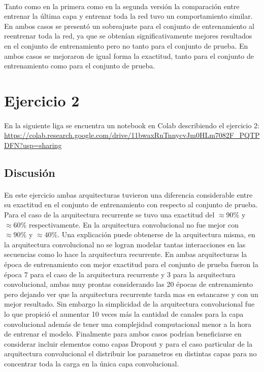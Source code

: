 \documentclass[12pt]{article}
\begin{document}
	  \paragraph{} Tanto como en la primera como en la segunda versión la comparación entre entrenar la última capa y entrenar toda la red tuvo un comportamiento similar. En ambos casos se presentó un sobreajuste para el conjunto de entrenamiento al reentrenar toda la red, ya que se obtenían significativamente mejores resultados en el conjunto de entrenamiento pero no tanto para el conjunto de prueba. En ambos casos se mejoraron de igual forma la exactitud, tanto para el conjunto de entrenamiento como para el conjunto de prueba. 
	  \section{Ejercicio 2}
	  \paragraph{} En la siguiente liga se encuentra un notebook en Colab describiendo el ejercicio 2:\\
	  \url{https://colab.research.google.com/drive/11bwaxRnTnnycvJm0HLm7082F_PQTPDFN?usp=sharing}\\
	  \subsection{Discusión}
	  \paragraph{} En este ejercicio ambas arquitecturas tuvieron una diferencia considerable entre su exactitud en el conjunto de entrenamiento con respecto al conjunto de prueba. Para el caso de la arquitectura recurrente se tuvo una exactitud del $\approx90\%$ y $\approx60\%$ respectivamente. En la arquitectura convolucional no fue mejor con $\approx90\%$ y $\approx40\%$. Una explicación puede obtenerse de la arquitectura misma, en la arquitectura convolucional no se logran modelar tantas interacciones en las secuencias como lo hace la arquitectura recurrente. En ambas arquitecturas la época de entrenamiento con mejor exactitud para el conjunto de prueba fueron la época 7 para el caso de la arquitectura recurrente y 3 para la arquitectura convolucional, ambas muy prontas considerando las 20 épocas de entrenamiento pero dejando ver que la arquitectura recurrente tarda mas en estancarse y con un mejor resultado. Sin embargo la simplicidad de la arquitectura convolucional fue lo que propició el aumentar 10 veces más la cantidad de canales para la capa convolucional además de tener una complejidad computacional menor a la hora de entrenar el modelo.  Finalmente para ambos casos podrían beneficiarse en considerar incluir elementos como capas Dropout y para el caso particular de la arquitectura convolucional el distribuir los parametros en distintas capas para no concentrar toda la carga en la única capa convolucional.
\end{document}
